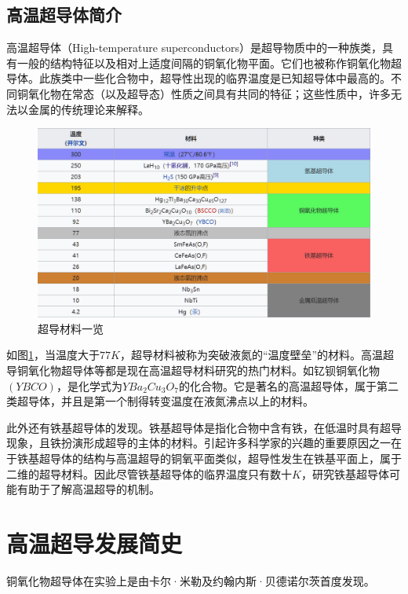 \documentclass[UTF8, twocolumn]{ctexart}
\begin{document}
    \subsection{高温超导体简介}

    高温超导体（High-temperature superconductors）是超导物质中的一种族类，具有一般的结构特征以及相对上适度间隔的铜氧化物平面。它们也被称作铜氧化物超导体。此族类中一些化合物中，超导性出现的临界温度是已知超导体中最高的。不同铜氧化物在常态（以及超导态）性质之间具有共同的特征；这些性质中，许多无法以金属的传统理论来解释。

    \begin{figure}[ht]
        \centering
        \includegraphics[scale=0.7]{image/超导材料.png}
        \caption{超导材料一览}
        \label{fig:image2}
    \end{figure}

    如图\ref{fig:image2}，当温度大于$77K$，超导材料被称为突破液氮的“温度壁垒”的材料。高温超导铜氧化物超导体等都是现在高温超导材料研究的热门材料。如钇钡铜氧化物$(YBCO)$，是化学式为$YBa_2 Cu_3 O_7$的化合物。它是著名的高温超导体，属于第二类超导体，并且是第一个制得转变温度在液氮沸点以上的材料。
    
    此外还有铁基超导体的发现。铁基超导体是指化合物中含有铁，在低温时具有超导现象，且铁扮演形成超导的主体的材料。引起许多科学家的兴趣的重要原因之一在于铁基超导体的结构与高温超导的铜氧平面类似，超导性发生在铁基平面上，属于二维的超导材料。因此尽管铁基超导体的临界温度只有数十$K$，研究铁基超导体可能有助于了解高温超导的机制。\cite{takahashi2008superconductivity}

\section{高温超导发展简史}

    铜氧化物超导体在实验上是由卡尔·米勒及约翰内斯·贝德诺尔茨首度发现。
\end{document}
